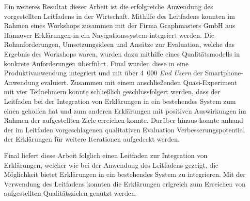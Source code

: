 Ein weiteres Resultat dieser Arbeit ist die erfolgreiche Anwendung des vorgestellten Leitfadens in der Wirtschaft. Mithilfe des Leitfadens konnten im Rahmen eines Workshops zusammen mit der Firma Graphmasters GmbH aus Hannover Erklärungen in ein Navigationssystem integriert werden. Die Rohanforderungen, Umsetzungsideen und Ansätze zur Evaluation, welche das Ergebnis des Workshops waren, wurden dazu mithilfe eines Qualitätsmodells in konkrete Anforderungen überführt. Final wurden diese in eine Produktivanwendung integriert und mit über 4~000 \textit{End Usern} der Smartphone-Anwendung evaluiert. Zusammen mit einem anschließenden Quasi-Experiment mit vier Teilnehmern konnte schließlich geschlussfolgert werden, dass der Leitfaden bei der Integration von Erklärungen in ein bestehendes System zum einen geholfen hat und zum anderen Erklärungen mit positiven Auswirkungen im Rahmen der aufgestellten Ziele erreichen konnte. Darüber hinaus konnte anhand der im Leitfaden vorgeschlagenen qualitativen Evaluation Verbesserungspotential der Erklärungen für weitere Iterationen aufgedeckt werden.

\bigskip

Final liefert diese Arbeit folglich einen Leitfaden zur Integration von Erklärungen, welcher wie bei der Anwendung des Leitfadens gezeigt, die Möglichkeit bietet Erklärungen in ein bestehendes System zu integrieren. Mit der Verwendung des Leitfadens konnten die Erklärungen erlgreich zum Erreichen von aufgestellten Qualitätszielen genutzt werden.






